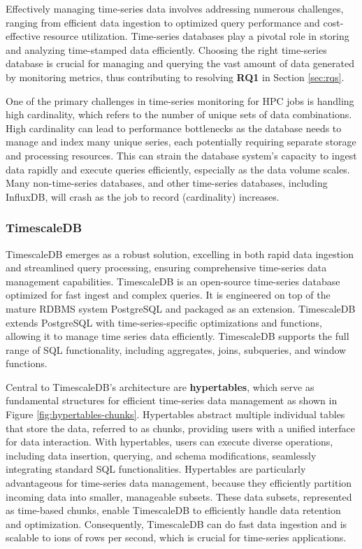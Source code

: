 Effectively managing time-series data involves addressing numerous challenges, ranging from efficient data ingestion to optimized query performance and cost-effective resource utilization. Time-series databases play a pivotal role in storing and analyzing time-stamped data efficiently. Choosing the right time-series database is crucial for managing and querying the vast amount of data generated by monitoring metrics, thus contributing to resolving \textbf{RQ1} in Section \ref{sec:rqs}.

One of the primary challenges in time-series monitoring for HPC jobs is handling high cardinality, which refers to the number of unique sets of data combinations. High cardinality can lead to performance bottlenecks as the database needs to manage and index many unique series, each potentially requiring separate storage and processing resources. This can strain the database system's capacity to ingest data rapidly and execute queries efficiently, especially as the data volume scales. Many non-time-series databases, and other time-series databases, including InfluxDB, will crash as the job to record (cardinality) increases.

\subsubsection{TimescaleDB}

TimescaleDB \cite{timescaledb} emerges as a robust solution, excelling in both rapid data ingestion and streamlined query processing, ensuring comprehensive time-series data management capabilities. TimescaleDB is an open-source time-series database optimized for fast ingest and complex queries. It is engineered on top of the mature RDBMS system PostgreSQL and packaged as an extension. TimescaleDB extends PostgreSQL with time-series-specific optimizations and functions, allowing it to manage time series data efficiently. TimescaleDB supports the full range of SQL functionality, including aggregates, joins, subqueries, and window functions.

Central to TimescaleDB's architecture are \textbf{hypertables}, which serve as fundamental structures for efficient time-series data management as shown in Figure \ref{fig:hypertables-chunks}. Hypertables abstract multiple individual tables that store the data, referred to as chunks, providing users with a unified interface for data interaction. With hypertables, users can execute diverse operations, including data insertion, querying, and schema modifications, seamlessly integrating standard SQL functionalities. Hypertables are particularly advantageous for time-series data management, because they efficiently partition incoming data into smaller, manageable subsets. These data subsets, represented as time-based chunks, enable TimescaleDB to efficiently handle data retention and optimization. Consequently, TimescaleDB can do fast data ingestion and is scalable to ions of rows per second, which is crucial for time-series applications.

